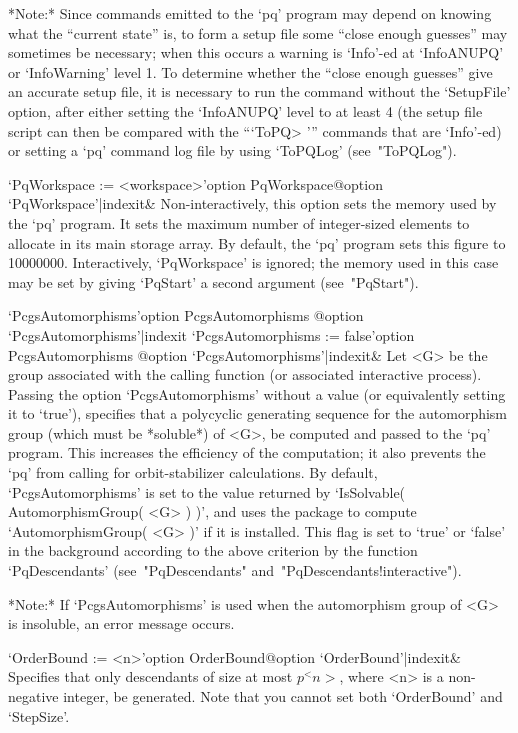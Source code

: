 *Note:*
Since commands emitted to the `pq' program may depend on knowing what the
``current state'' is, to form a setup file some ``close enough  guesses''
may sometimes be necessary; when this occurs a warning  is  `Info'-ed  at
`InfoANUPQ' or `InfoWarning' level 1. To determine  whether  the  ``close
enough guesses'' give an accurate setup file, it is necessary to run  the
command  without  the  `SetupFile'  option,  after  either  setting   the
`InfoANUPQ' level to at least 4  (the  setup  file  script  can  then  be
compared with the ```ToPQ> ''' commands that are `Info'-ed) or setting  a
`pq' command log file by using `ToPQLog' (see~"ToPQLog").

\>`PqWorkspace := <workspace>'{option PqWorkspace}@{option `PqWorkspace'|indexit}&
Non-interactively, this option sets the memory used by the `pq'  program.
It sets the maximum number of integer-sized elements to allocate  in  its
main storage array. By default, the `pq'  program  sets  this  figure  to
10000000. Interactively, `PqWorkspace' is ignored;  the  memory  used  in
this  case  may  be  set  by   giving   `PqStart'   a   second   argument
(see~"PqStart").

\>`PcgsAutomorphisms'{option PcgsAutomorphisms}%
@{option `PcgsAutomorphisms'|indexit}
\>`PcgsAutomorphisms := false'{option PcgsAutomorphisms}%
@{option `PcgsAutomorphisms'|indexit}&
Let <G> be the group associated with the calling function (or  associated
interactive process). Passing the option  `PcgsAutomorphisms'  without  a
value (or equivalently setting it to `true'), specifies that a polycyclic
generating sequence for the automorphism group (which must be  *soluble*)
of <G>, be computed and passed to the `pq'  program.  This  increases  the
efficiency of the computation; it also prevents  the  `pq'  from  calling
{\GAP} for orbit-stabilizer calculations. By default, `PcgsAutomorphisms'
is set to the value returned by `IsSolvable( AutomorphismGroup( <G> ) )',
and uses the package {\AutPGrp} to compute `AutomorphismGroup( <G> )'  if
it is installed. This flag is set to `true' or `false' in the  background
according  to  the  above  criterion  by  the  function   `PqDescendants'
(see~"PqDescendants" and~"PqDescendants!interactive").

*Note:*
If `PcgsAutomorphisms' is used when the  automorphism  group  of  <G>  is
insoluble, an error message occurs.

\>`OrderBound := <n>'{option OrderBound}@{option `OrderBound'|indexit}&
Specifies that only descendants of size at most $p^<n>$, where <n>  is  a
non-negative integer,  be  generated.  Note  that  you  cannot  set  both
`OrderBound' and `StepSize'.

